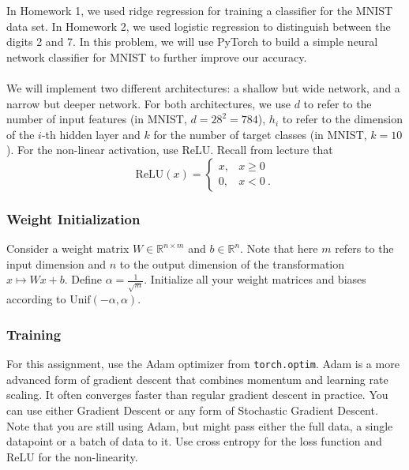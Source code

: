 \documentclass{article}
\begin{document}
\begin{aprob}
    \label{code-nn-mnist}
    In Homework 1, we used ridge regression for training a classifier for the MNIST data set.
    In Homework 2, we used logistic regression to distinguish between the digits 2 and 7.
    In this problem, we will use PyTorch to build a simple neural network classifier for MNIST to further improve our accuracy.\\\\
    We will implement two different architectures: a shallow but wide network, and a narrow but deeper network. For both architectures,
    we use $d$ to refer to the number of input features (in MNIST, $d=28^2 = 784$), $h_i$ to refer to the dimension of the $i$-th hidden layer and $k$ for the number of target classes (in MNIST, $k=10$). For the non-linear activation, use ReLU. Recall from lecture that
    \[ \text{ReLU}(x) = \begin{cases} 
          x, & x \geq 0 \\
          0, & x < 0 \ .
       \end{cases}
    \]
    \subsubsection*{Weight Initialization}
    Consider a weight matrix $W \in \mathbb{R}^{n \times m}$ and $b \in \mathbb{R}^n$. Note that here $m$ refers to the input dimension and
    $n$ to the output dimension of the transformation $x \mapsto Wx + b$. Define $\alpha = \frac{1}{\sqrt{m}}$.
    Initialize all your weight matrices and biases according to $\text{Unif}(-\alpha, \alpha)$.
    
    \subsubsection*{Training}
    For this assignment, use the Adam optimizer from \texttt{torch.optim}. Adam is a more advanced form of gradient descent that combines momentum and learning rate scaling. It often converges faster than regular gradient descent in practice. You can use either Gradient Descent or any form of Stochastic Gradient Descent. Note that you are still using Adam, but might pass either the full data, a single datapoint or a batch of data to it. Use cross entropy for the loss function and ReLU for the non-linearity.

\end{aprob}
\end{document}
